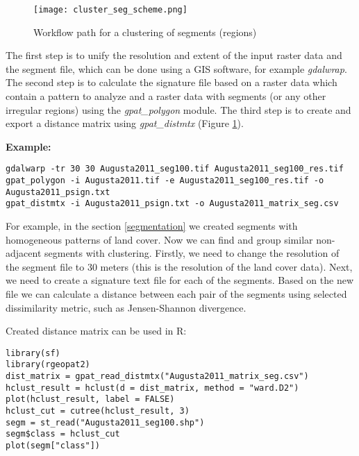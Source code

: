 \begin{figure}[H]
	\centering
	\texttt{[image: cluster\_seg\_scheme.png]}
	\caption{Workflow path for a clustering of segments (regions)}
	\label{FIG:CLUSTER_SEGMENT}
\end{figure}

The first step is to unify the resolution and extent of the input raster data and the segment file, which can be done using a GIS software, for example {\it gdalwrap}.
The second step is to calculate the signature file based on a raster data which contain a pattern to analyze and a raster data with segments (or any other irregular regions) using the {\it gpat\_polygon} module.
The third step is to create and export a distance matrix using {\it gpat\_distmtx} (Figure \ref{FIG:CLUSTER_SEGMENT}).

{\bf Example:}

\begin{minipage}{\linewidth}
\begin{lstlisting}
gdalwarp -tr 30 30 Augusta2011_seg100.tif Augusta2011_seg100_res.tif
gpat_polygon -i Augusta2011.tif -e Augusta2011_seg100_res.tif -o Augusta2011_psign.txt
gpat_distmtx -i Augusta2011_psign.txt -o Augusta2011_matrix_seg.csv
\end{lstlisting}
\end{minipage}

For example, in the section \ref{segmentation} we created segments with homogeneous patterns of land cover.
Now we can find and group similar non-adjacent segments with clustering.
Firstly, we need to change the resolution of the segment file to 30 meters (this is the resolution of the land cover data).
Next, we need to create a signature text file for each of the segments.
Based on the new file we can calculate a distance between each pair of the segments using selected dissimilarity metric, such as Jensen-Shannon divergence.

Created distance matrix can be used in R:

\begin{minipage}{\linewidth}
\begin{lstlisting}
library(sf)
library(rgeopat2)
dist_matrix = gpat_read_distmtx("Augusta2011_matrix_seg.csv")
hclust_result = hclust(d = dist_matrix, method = "ward.D2")
plot(hclust_result, label = FALSE)
hclust_cut = cutree(hclust_result, 3)
segm = st_read("Augusta2011_seg100.shp")
segm$class = hclust_cut
plot(segm["class"])
\end{lstlisting}
\end{minipage}

